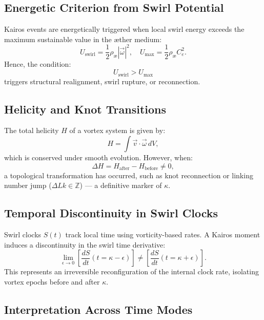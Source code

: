 \documentclass[12pt]{article}
\begin{document}
    \subsection{Energetic Criterion from Swirl Potential}
    Kairos events are energetically triggered when local swirl energy exceeds the maximum sustainable value in the æther medium:
    \begin{equation}
        U_{\text{swirl}} = \frac{1}{2} \rho_{\text{\ae}} |\vec{\omega}|^2,
        \quad
        U_{\text{max}} = \frac{1}{2} \rho_{\text{\ae}} C_e^2.
    \end{equation}
    Hence, the condition:
    \[
        U_{\text{swirl}} > U_{\text{max}}
    \]
    triggers structural realignment, swirl rupture, or reconnection.

    \subsection{Helicity and Knot Transitions}
    The total helicity \( H \) of a vortex system is given by:
    \begin{equation}
        H = \int \vec{v} \cdot \vec{\omega} \, dV,
    \end{equation}
    which is conserved under smooth evolution. However, when:
    \[
        \Delta H = H_{\text{after}} - H_{\text{before}} \neq 0,
    \]
    a topological transformation has occurred, such as knot reconnection or linking number jump (\( \Delta Lk \in \mathbb{Z} \)) — a definitive marker of \( \kappa \).

    \subsection{Temporal Discontinuity in Swirl Clocks}
    Swirl clocks \( S(t) \) track local time using vorticity-based rates. A Kairos moment induces a discontinuity in the swirl time derivative:
    \begin{equation}
        \lim_{\epsilon \to 0} \left[ \frac{dS}{dt}(t = \kappa - \epsilon) \right]
        \neq
        \left[ \frac{dS}{dt}(t = \kappa + \epsilon) \right].
    \end{equation}
    This represents an irreversible reconfiguration of the internal clock rate, isolating vortex epochs before and after \( \kappa \).

    \subsection{Interpretation Across Time Modes}
\end{document}
